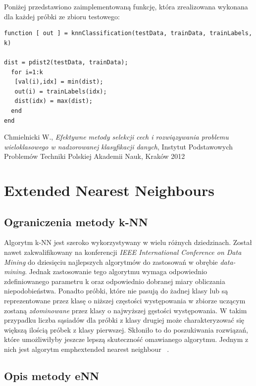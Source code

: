 \documentclass[[10pt,a4paper]{article}
\begin{document}
Poniżej przedstawiono zaimplementowaną funkcję, która zrealizowana wykonana dla każdej próbki ze zbioru testowego:

\begin{lstlisting}
function [ out ] = knnClassification(testData, trainData, trainLabels, k)

dist = pdist2(testData, trainData);
  for i=1:k
   [val(i),idx] = min(dist);
   out(i) = trainLabels(idx);
   dist(idx) = max(dist);
  end
end
\end{lstlisting}

\begin{thebibliography}{99}
 Chmielnicki W., \emph{Efektywne metody selekcji cech i rozwiązywania problemu wieloklasowego w nadzorowanej klasyfikacji danych}, Instytut Podstawowych Problemów Techniki Polskiej Akademii Nauk, Kraków 2012
\end{thebibliography}

\section{Extended Nearest Neighbours} 
\subsection{Ograniczenia metody k-NN}
Algorytm k-NN jest szeroko wykorzystywany w wielu różnych dziedzinach. Został nawet zakwalifikowany na konferencji \emph{IEEE International Conference on Data Mining} do dziesięciu najlepszych algorytmów do zastosowań w obrębie \emph{data-mining}. Jednak zastosowanie tego algorytmu wymaga odpowiednio zdefiniowanego parametru k oraz odpowiednio dobranej miary obliczania niepodobieństwa. Ponadto próbki, które nie pasują do żadnej klasy lub są reprezentowane przez klasę o niższej częstości występowania w zbiorze uczącym zostaną \emph{zdominowane} przez klasy o najwyższej gęstości występowania. W takim przypadku liczba sąsiadów dla próbki z klasy drugiej może charakteryzować się większą ilością próbek z klasy pierwszej. Skłoniło to do poszukiwania rozwiązań, które umożliwiłyby jeszcze lepszą skuteczność omawianego algorytmu. Jednym z nich jest algorytm emph{extended nearest neighbour} ~\cite{knn}.

\subsection{Opis metody eNN }
\end{document}
